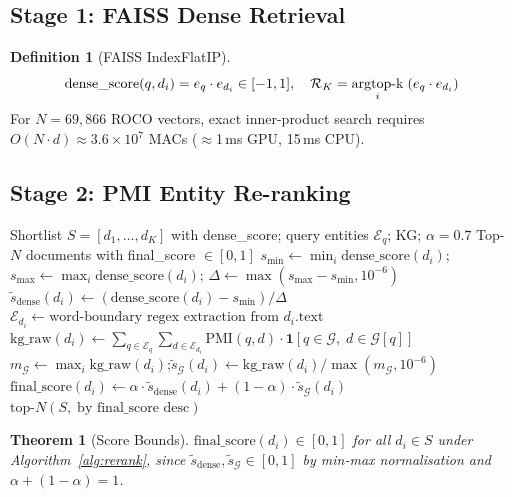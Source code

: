 \documentclass[12pt,a4paper]{article}
\theoremstyle{definition}
\newtheorem{definition}{Definition}[section]
\theoremstyle{plain}
\newtheorem{theorem}{Theorem}[section]
\theoremstyle{remark}
\newcommand{\KG}{\mathcal{G}}
\newcommand{\argtopk}{\operatornamewithlimits{argtop\text{-}k}}
\begin{document}
\subsection{Stage 1: FAISS Dense Retrieval}

\begin{definition}[FAISS IndexFlatIP]
\[
  \text{dense\_score}(q, d_i) = e_q \cdot e_{d_i} \in [-1,1], \quad
  \mathcal{R}_K = \argtopk_{i}\;(e_q \cdot e_{d_i})
\]
For $N = 69{,}866$ ROCO vectors, exact inner-product search requires $O(N \cdot d) \approx 3.6 \times 10^7$ MACs ($\approx$1\,ms GPU, 15\,ms CPU).
\end{definition}

\subsection{Stage 2: PMI Entity Re-ranking}

\begin{algorithm}[H]
\caption{NER KG Re-ranker (Full Algorithm)}
\label{alg:rerank}
\begin{algorithmic}[1]
\Require Shortlist $S = [d_1,\ldots,d_K]$ with dense\_score; query entities $\mathcal{E}_q$; KG; $\alpha = 0.7$
\Ensure Top-$N$ documents with final\_score $\in [0,1]$
\State $s_{\min} \gets \min_i \text{dense\_score}(d_i)$;\; $s_{\max} \gets \max_i \text{dense\_score}(d_i)$;\; $\Delta \gets \max(s_{\max}-s_{\min}, 10^{-6})$
\State $\tilde{s}_{\text{dense}}(d_i) \gets (\text{dense\_score}(d_i) - s_{\min}) / \Delta$
  \State $\mathcal{E}_{d_i} \gets \text{word-boundary regex extraction from } d_i.\text{text}$
  \State $\text{kg\_raw}(d_i) \gets \sum_{q \in \mathcal{E}_q}\sum_{d \in \mathcal{E}_{d_i}} \text{PMI}(q,d) \cdot \mathbf{1}[q \in \KG,\; d \in \KG[q]]$
\EndFor
\State $m_{\KG} \gets \max_i \text{kg\_raw}(d_i)$;\quad $\tilde{s}_{\KG}(d_i) \gets \text{kg\_raw}(d_i) / \max(m_{\KG}, 10^{-6})$
  \State $\text{final\_score}(d_i) \gets \alpha \cdot \tilde{s}_{\text{dense}}(d_i) + (1-\alpha)\cdot\tilde{s}_{\KG}(d_i)$
\EndFor
\State \Return $\text{top-}N(S,\; \text{by final\_score desc})$
\end{algorithmic}
\end{algorithm}

\begin{theorem}[Score Bounds]
$\text{final\_score}(d_i) \in [0,1]$ for all $d_i \in S$ under Algorithm~\ref{alg:rerank}, since $\tilde{s}_{\text{dense}}, \tilde{s}_{\KG} \in [0,1]$ by min-max normalisation and $\alpha + (1-\alpha) = 1$.
\end{theorem}
\end{document}
